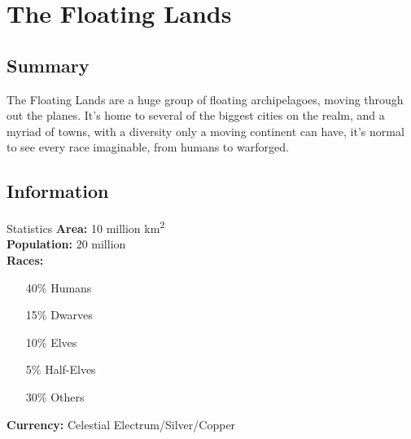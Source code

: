 


\chapter{The Floating Lands}
\section{Summary}
The Floating Lands are a huge group of floating archipelagoes, moving through out the planes. It's home to several of the biggest cities on the realm, and a myriad of towns, with a diversity only a moving continent can have, it's normal to see every race imaginable, from humans to warforged.

\section{Information}

\begin{monsterbox}{Statistics}
    \textbf{Area:} 10 million \si{\square\kilo\meter}\\

    \textbf{Population:} 20 million\\

    \textbf{Races:}
    \begin{itemize}[leftmargin=1.3cm, labelsep=0.2cm]
        \item[40\%] Humans
        \item[15\%] Dwarves
        \item[10\%] Elves
        \item[5\%] Half-Elves
        \item[30\%]  Others
    \end{itemize}

    \textbf{Currency:}    Celestial Electrum/Silver/Copper   \\
\end{monsterbox}

